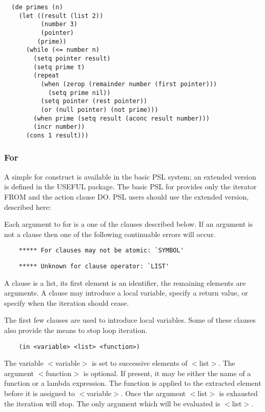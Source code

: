 \begin{verbatim}
  (de primes (n)
    (let ((result (list 2))
          (number 3)
          (pointer)
         (prime))
      (while (<= number n)
        (setq pointer result)
        (setq prime t)
        (repeat
          (when (zerop (remainder number (first pointer)))
            (setq prime nil))
          (setq pointer (rest pointer))
          (or (null pointer) (not prime)))
        (when prime (setq result (aconc result number)))
        (incr number))
      (cons 1 result)))
\end{verbatim}
\subsubsection{For}

  A simple for construct is available in the basic  PSL  system;
an extended version is defined in the USEFUL package.  The basic
PSL  for  provides  only the iterator FROM and the action clause
DO.  PSL users should use the extended version, described here:


{    Each argument to for is  a  one  of  the  clauses  described
    below.    If  an  argument  is  not a clause then one of the
    following continuable errors will occur.
}
\begin{verbatim}
    ***** For clauses may not be atomic: `SYMBOL'
\end{verbatim}
\begin{verbatim}
    ***** Unknown for clause operator: `LIST'
\end{verbatim}
    A clause is a list, its first element is an identifier,  the
    remaining  elements are arguments.  A clause may introduce a
    local variable, specify a return value, or specify when  the
    iteration should cease.

    The first few clauses are used to introduce local variables.
    Some  of  these  clauses also provide the means to stop loop
    iteration.


\begin{verbatim}
    (in <variable> <list> <function>)
\end{verbatim}
      The variable $<$variable$>$ is set to successive elements of
						$<$list$>$.  The
      argument $<$function$>$ is optional. If present, it may be either the
      name of a function or a lambda expression.  The function is applied to
      the extracted element before it is assigned to $<$variable$>$.  Once
						the
      argument $<$list$>$ is exhausted the iteration will stop. The only
      argument which will be evaluated is $<$list$>$.

